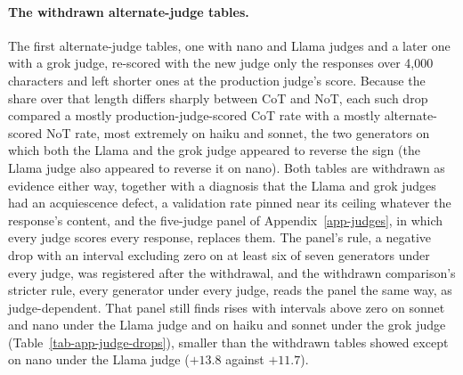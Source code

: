 \paragraph{The withdrawn alternate-judge tables.}
The first alternate-judge tables, one with nano and Llama judges and a later
one with a grok judge, re-scored with the new judge only the responses over
4,000 characters and left shorter ones at the production judge's score.
Because the share over that length differs sharply between CoT and NoT, each
such drop compared a mostly production-judge-scored CoT rate with a mostly
alternate-scored NoT rate, most extremely on haiku and sonnet, the two
generators on which both the Llama and the grok judge appeared to reverse the
sign (the Llama judge also appeared to reverse it on nano).
Both tables are withdrawn as evidence either way, together with a diagnosis
that the Llama and grok judges had an acquiescence defect, a validation rate
pinned near its ceiling whatever the response's content, and the five-judge
panel of Appendix~\ref{app-judges}, in which every judge scores every
response, replaces them.
The panel's rule, a negative drop with an interval excluding zero on at
least six of seven generators under every judge, was registered after the
withdrawal, and the withdrawn comparison's stricter rule, every generator
under every judge, reads the panel the same way, as judge-dependent.
That panel still finds rises with intervals above
zero on sonnet and nano under the Llama judge and on haiku and sonnet under
the grok judge (Table~\ref{tab-app-judge-drops}), smaller than the withdrawn
tables showed except on nano under the Llama judge ($+13.8$ against $+11.7$).

